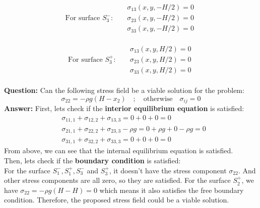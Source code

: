 \documentclass[letter,12pt]{article}
\begin{document}
\begin{equation}
\text{For surface } S_{3}^{-}: \text{	}
\begin{aligned}
&\sigma_{13}(x,y,-H/2)=0\\
&\sigma_{23}(x,y,-H/2)=0\\
&\sigma_{33}(x,y,-H/2)=0
\end{aligned}
\end{equation} \\

\begin{equation}
\text{For surface } S_{3}^{+}: \text{	}
\begin{aligned}
&\sigma_{13}(x,y,H/2)=0\\
&\sigma_{23}(x,y,H/2)=0\\
&\sigma_{33}(x,y,H/2)=0
\end{aligned}
\end{equation}\\
	
\noindent \textbf{Question:} Can the following stress field be a viable solution for the problem:\\
\begin{equation}
\sigma_{22}=-\rho g (H-x_2) \quad ; \quad  \text{otherwise} \quad \sigma_{ij} =0
\end{equation} 
\noindent \textbf{Answer:} 
First, lets check if the \textbf{interior equilibrium equation} is satisfied:
\begin{equation}
\begin{aligned}
& \sigma_{11,1}+\sigma_{12,2}+\sigma_{13,3}=0+0+0=0 \\
& \sigma_{21,1}+\sigma_{22,2}+\sigma_{23,3}-\rho g=0+\rho g+0-\rho g=0 \\
& \sigma_{31,1}+\sigma_{32,2}+\sigma_{33,3}=0+0+0=0
\end{aligned}
\end{equation}
From above, we can see that the internal equilibrium equation is satisfied. \\

Then, lets check if the \textbf{boundary condition} is satisfied: \\
For the surface $S_{1}^{-}, S_{1}^{+}, S_{3}^{-}$ and $S_{3}^{+}$, it doesn't have the stress component $\sigma_{22}$. And other stress components are all zero, so they are satisfied. For the surface $S_{2}^{+}$, we have $\sigma_{22} = -\rho g (H-H) = 0$ which means it also satisfies the free boundary condition. Therefore, the proposed stress field could be a viable solution.
\\





 
 
 


 
\end{document}
